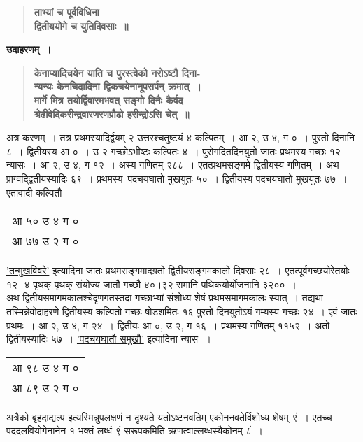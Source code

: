 \documentclass[11pt, openany]{book}
\begin{document}
\newpage

 \label{3.8}
\begin{quote}
{\large \textbf{{\color{purple}ताभ्यां च पूर्वविधिना \\
द्वितीययोगे च युतिदिवसाः~॥}}}
\end{quote}

\noindent \textbf{उदाहरणम्~।}

 \label{Ex 3.9}
\begin{quote}
\textbf{{\color{red}केनाप्यादिचयेन याति च पुरस्त्वेको नरोऽष्टौ दिना-\\
न्यन्यः केनचिदादिना द्विकचयेनानूपसर्पन् क्रमात्~।\\
मार्गे मित्र तयोर्द्विवारमभवत् सङ्गो दिनैः कैर्वद\\
श्रेढीवेदिकरीन्द्रवारणरणप्रौढो हरीन्द्रोऽसि चेत्~॥}}
\end{quote}

\begin{sloppypar}
अत्र करणम्~। तत्र प्रथमस्यादिर्द्वयम् २ उत्तरश्चतुष्टयं ४ कल्पितम्~। आ २, उ ४, ग ०~। पुरतो दिनानि ८~। द्वितीयस्य आ ०~। उ २ गच्छोऽभीष्टः कल्पितः ४~। पुरोगदितदिनयुतो जातः प्रथमस्य गच्छः १२~। न्यासः~। आ २, उ ४, ग १२~। अस्य गणितम् २८८~। एतत्प्रथमसङ्गमे द्वितीयस्य गणितम्~। अथ प्राग्वद्द्वितीयस्यादिः ६९~। प्रथमस्य~पदचयघातो मुखयुतः ५०~। द्वितीयस्य पदचयघातो मुखयुतः ७७~। एतावादी कल्पितौ \begin{small}\begin{tabular}{l|}
आ ५० उ ४ ग ० \\
आ ७७ उ २ ग ०
\end{tabular}\end{small}\; \hyperref[3.6]{'तन्मुखविवरे'} इत्यादिना जातः प्रथमसङ्गमादग्रतो द्वितीयसङ्गमकालो दिवसाः २८~। एतत्पूर्वगच्छयोरेतयोः १२।४ पृथक् पृथक् संयोज्य जातौ गच्छौ ४०।३२ समानि पथिकयोर्योजनानि ३२००~। \\

अथ द्वितीयसमागमकालश्चेदृणगतस्तदा गच्छाभ्यां संशोध्य शेषं प्रथमसमागमकालः स्यात्~। तद्यथा\textendash \\

तस्मिन्नेवोदाहरणे द्वितीयस्य कल्पितो गच्छः षोडशमितः १६ पुरतो दिनयुतोऽयं गम्यस्य गच्छः २४~। एवं जातः प्रथमः~। आ २, उ ४, ग २४~। द्वितीयः आ ०, उ २, ग १६~। प्रथमस्य गणितम् ११५२~। अतो द्वितीयस्यादिः ५७~। \hyperref[3.7]{'पदचयघातौ समुखौ'} इत्यादिना न्यासः~। \begin{small}\begin{tabular}{l|}
आ ९८ उ ४ ग ० \\
आ ८९ उ २ ग ०
\end{tabular}\end{small}\; अत्रैको बृहदाद्यल्प इत्यस्मिन्नुपलक्षणं न दृश्यते यतोऽष्टनवतिम् एकोननवतेर्विशोध्य शेषम् ९ं~। एतच्च पददलवियोगेनानेन १ भक्तं लब्धं ९ं सरूपकमिति ऋणत्वाल्लब्धस्यैकोनम् ८ं~।
\end{sloppypar}
\end{document}
